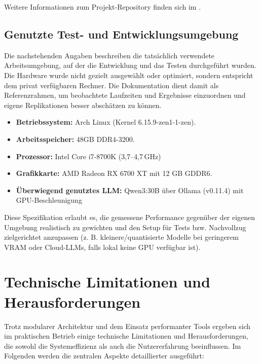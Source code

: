       Weitere Informationen zum Projekt-Repository finden sich im .

    \subsection{Genutzte Test- und Entwicklungsumgebung}

      Die nachstehenden Angaben beschreiben die tatsächlich verwendete Arbeitsumgebung, auf der die Entwicklung und das Testen durchgeführt wurden.
      Die Hardware wurde nicht gezielt ausgewählt oder optimiert, sondern entspricht dem privat verfügbaren Rechner.
      Die Dokumentation dient damit als Referenzrahmen, um beobachtete Laufzeiten und Ergebnisse einzuordnen und eigene Replikationen besser abschätzen zu können.

      \begin{itemize}
        \item \textbf{Betriebssystem:} Arch Linux (Kernel 6.15.9-zen1-1-zen).
        \item \textbf{Arbeitsspeicher:} 48GB DDR4-3200.
        \item \textbf{Prozessor:} Intel Core i7-8700K (3{,}7–4{,}7\,GHz)
        \item \textbf{Grafikkarte:} AMD Radeon RX 6700 XT mit 12 GB GDDR6.
        \item \textbf{Überwiegend genutztes LLM:} Qwen3:30B über Ollama (v0.11.4) mit \acs{GPU}-Beschleunigung
      \end{itemize}

      Diese Spezifikation erlaubt es, die gemessene Performance gegenüber der eigenen Umgebung realistisch zu gewichten und den Setup für Tests bzw. Nachvollzug zielgerichtet anzupassen (z. B. kleinere/quantisierte Modelle bei geringerem VRAM oder Cloud-\acs{LLM}s, falls lokal keine \acs{GPU} verfügbar ist).

  \section{Technische Limitationen und Herausforderungen}

    Trotz modularer Architektur und dem Einsatz performanter Tools ergeben sich im praktischen Betrieb einige technische Limitationen und Herausforderungen, die sowohl die Systemeffizienz als auch die Nutzererfahrung beeinflussen.
    Im Folgenden werden die zentralen Aspekte detaillierter ausgeführt:

